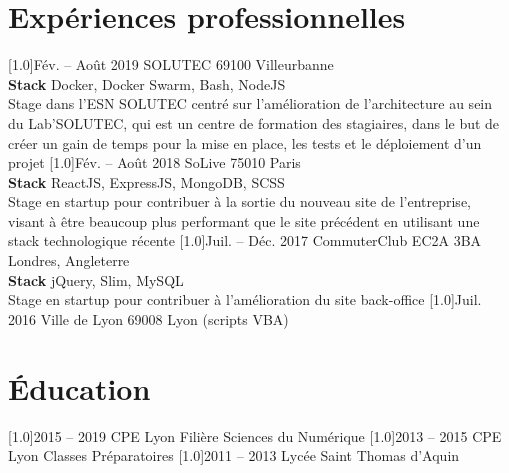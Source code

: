 \documentclass[french]{cv-style}          %
\begin{document}
\section{Expériences professionnelles}
\begin{entrylist}
\vspace{0.5cm}
\entry
  {\scalebox{.8}[1.0]{Fév. -- Août 2019}}
  {SOLUTEC}
  {69100 Villeurbanne}
  {\\
  \textbf{Stack} Docker, Docker Swarm, Bash, NodeJS\\
  Stage dans l'ESN SOLUTEC centré sur l'amélioration de l'architecture au sein du Lab'SOLUTEC, qui est un centre de formation des stagiaires,
  dans le but de créer un gain de temps pour la mise en place, les tests et le déploiement d'un projet}
\vspace{0.5cm}
\entry
  {\scalebox{.8}[1.0]{Fév. -- Août 2018}}
  {SoLive}
  {75010 Paris}
  {\\
  \textbf{Stack} ReactJS, ExpressJS, MongoDB, SCSS\\
  Stage en startup pour contribuer à la sortie du nouveau site de l'entreprise, visant à être beaucoup plus performant que le site précédent
  en utilisant une stack technologique récente}
\vspace{0.5cm}
\entry
  {\scalebox{.8}[1.0]{Juil. -- Déc. 2017}}
  {CommuterClub}
  {EC2A 3BA Londres, Angleterre}
  {\\
  \textbf{Stack} jQuery, Slim, MySQL\\
  Stage en startup pour contribuer à l'amélioration du site back-office}
\entry
  {\scalebox{.8}[1.0]{Juil. 2016}}
  {Ville de Lyon}
  {69008 Lyon}
  {(scripts VBA)}
 
\end{entrylist}

\section{Éducation}
\begin{entrylist}
\vspace{0.5cm}
\entry
  {\scalebox{.8}[1.0]{2015 -- 2019}}
  {CPE Lyon}
  {}
  {Filière Sciences du Numérique}
\vspace{0.5cm}
\entry
  {\scalebox{.8}[1.0]{2013 -- 2015}}
  {CPE Lyon}
  {}
  {Classes Préparatoires}
\entry
  {\scalebox{.8}[1.0]{2011 -- 2013}}
  {Lycée Saint Thomas d'Aquin}
  {}
  {}
 
\end{entrylist}
\end{document}
